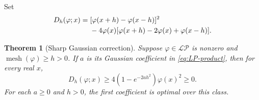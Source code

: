 \documentclass[11pt]{article}
\newtheorem{theorem}{Theorem}[section]
\theoremstyle{remark}\newtheorem{remark}[theorem]{Remark}
\newcommand{\LP}{\mathcal{LP}}
\DeclareMathOperator{\mesh}{mesh}
\begin{document}
Set
\begin{align}
 D_h(\varphi;x)={}&[\varphi(x+h)-\varphi(x-h)]^2\notag\\
 &-4\varphi(x)[\varphi(x+h)-2\varphi(x)+\varphi(x-h)].\label{eq:Dh}
\end{align}

\begin{theorem}[Sharp Gaussian correction]\label{thm:LP}
Suppose $\varphi\in\LP$ is nonzero and $\mesh(\varphi)\ge h>0$.
If $a$ is its Gaussian coefficient in \eqref{eq:LP-product}, then for
every real $x$,
\begin{equation}\label{eq:LP-main}
 D_h(\varphi;x)\ge4(1-e^{-2ah^2})\varphi(x)^2\ge0.
\end{equation}
For each $a\ge0$ and $h>0$, the first coefficient is optimal over this class.
\end{theorem}
\end{document}

